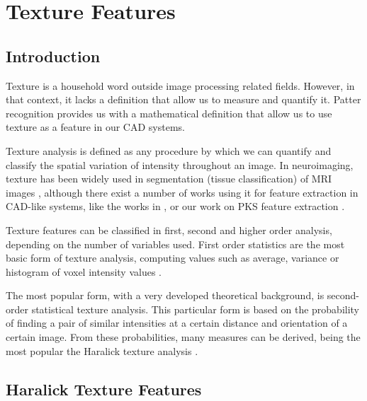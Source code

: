 \chapter{Texture Features}\label{ch:texture}
\section{Introduction}
Texture is a household word outside image processing related fields. However, in that context, it lacks a definition that allow us to measure and quantify it. Patter recognition provides us with a mathematical definition that allow us to use texture as a feature in our \ac{CAD} systems. 

Texture analysis is defined as any procedure by which we can quantify and classify the spatial variation of intensity throughout an image. In neuroimaging, texture has been widely used in segmentation (tissue classification) of \ac{MRI} images \cite{}, although there exist a number of works using it for feature extraction in \ac{CAD}-like systems, like the works in \cite{}, or our work on \ac{PKS} feature extraction \cite{Martinez-Murcia2013266,Martinez-Murcia2014}. 

Texture features can be classified in first, second and higher order analysis, depending on the number of variables used. First order statistics \cite{bibid} are the most basic form of texture analysis, computing values such as average, variance or histogram of voxel intensity values \cite{}. 

The most popular form, with a very developed theoretical background, is second-order statistical texture analysis. This particular form is based on the probability of finding a pair of similar intensities at a certain distance and orientation of a certain image. From these probabilities, many measures can be derived, being the most popular the Haralick texture analysis \cite{bibid}. 

\section{Haralick Texture Features}
